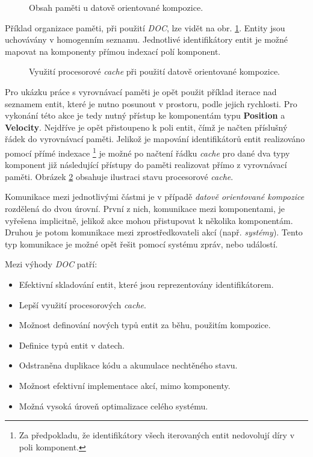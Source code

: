 \begin{figure}
	\caption{Obsah paměti u datově orientované kompozice.}
	\label{Fig:DOCMemory}
\end{figure}

Příklad organizace paměti, při použití \emph{DOC}, lze vidět na obr. \ref{Fig:DOCMemory}. Entity jsou uchovávány v homogenním seznamu. Jednotlivé identifikátory entit je možné mapovat na komponenty přímou indexací polí komponent.

\begin{figure}
	\caption{Využití procesorové \emph{cache} při použití datově orientované kompozice.}
	\label{Fig:DOCCache}
\end{figure}

Pro ukázku práce s vyrovnávací paměti je opět použit příklad iterace nad seznamem entit, které je nutno posunout v prostoru, podle jejich rychlosti. Pro vykonání této akce je tedy nutný přístup ke komponentám typu \textbf{Position} a \textbf{Velocity}. Nejdříve je opět přistoupeno k poli entit, čímž je načten příslušný řádek do vyrovnávací paměti. Jelikož je mapování identifikátorů entit realizováno pomocí přímé indexace \footnote{Za předpokladu, že identifikátory všech iterovaných entit nedovolují díry v poli komponent.} je možné po načtení řádku \emph{cache} pro dané dva typy komponent již následující přístupy do paměti realizovat přímo z vyrovnávací paměti. Obrázek \ref{Fig:DOCCache} obsahuje ilustraci stavu procesorové \emph{cache}.

Komunikace mezi jednotlivými částmi je v případě \emph{datově orientované kompozice} rozdělená do dvou úrovní. První z nich, komunikace mezi komponentami, je vyřešena implicitně, jelikož akce mohou přistupovat k několika komponentám. Druhou je potom komunikace mezi zprostředkovateli akcí (např. \emph{systémy}). Tento typ komunikace je možné opět řešit pomocí systému zpráv, nebo událostí. 

\noindent Mezi výhody \emph{DOC} patří: 
\begin{itemize}
	\item Efektivní skladování entit, které jsou reprezentovány identifikátorem.
	\item Lepší využití procesorových \emph{cache}.
	\item Možnost definování nových typů entit za běhu, použitím kompozice.
	\item Definice typů entit v datech.
	\item Odstraněna duplikace kódu a akumulace nechtěného stavu.
	\item Možnost efektivní implementace akcí, mimo komponenty.
	\item Možná vysoká úroveň optimalizace celého systému.
\end{itemize}

